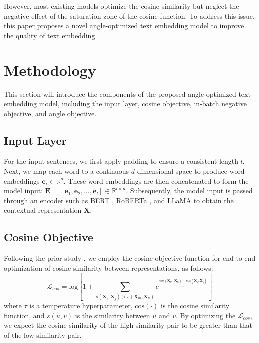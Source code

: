 \documentclass{article} \usepackage{iclr2024_conference,times}
\begin{document}
However, most existing models optimize the cosine similarity but neglect the negative effect of the saturation zone of the cosine function. To address this issue, this paper proposes a novel angle-optimized text embedding model to improve the quality of text embedding.

\section{Methodology}
This section will introduce the components of the proposed angle-optimized text embedding model, including the input layer, cosine objective, in-batch negative objective, and angle objective.

\subsection{Input Layer}
For the input sentences, we first apply padding to ensure a consistent length $l$. Next, we map each word to a continuous $d$-dimensional space to produce word embeddings $\mathbf{e}_i \in \mathbb{R}^d$. These word embeddings are then concatenated to form the model input: $\mathbf{E} = [\mathbf{e}_1, \mathbf{e}_2, \dots, \mathbf{e}_l] \in \mathbb{R}^{l \times d}$. Subsequently, the model input is passed through an encoder such as BERT \citep{DevlinCLT19BERT}, RoBERTa \citep{roberta-liu-2019}, and LLaMA \citep{touvron2023llama, touvron2023llama2}  to obtain the contextual representation $\mathbf{X}$.

\subsection{Cosine Objective}
Following the prior study \citep{cosent_su_2022}, we employ the cosine objective function for end-to-end optimization of cosine similarity between representations, as follows:
\begin{equation}
    \mathcal{L}_{cos} = \mathrm{log} \left [ 1 + \sum _{s(\mathbf{X}_i, \mathbf{X}_j) > s(\mathbf{X}_m, \mathbf{X}_n)} e^{\frac{\mathrm{cos}(\mathbf{X}_m, \mathbf{X}_n) - \mathrm{cos}(\mathbf{X}_i, \mathbf{X}_j)}{\tau}} \right ] 
\end{equation}
where $\tau$ is a temperature hyperparameter, $\mathrm{cos}(\cdot)$ is the cosine similarity function, and $s(u, v)$ is the similarity between $u$ and $v$. By optimizing the $\mathcal{L}_{cos}$, we expect the cosine similarity of the high similarity pair to be greater than that of the low similarity pair.
\end{document}
